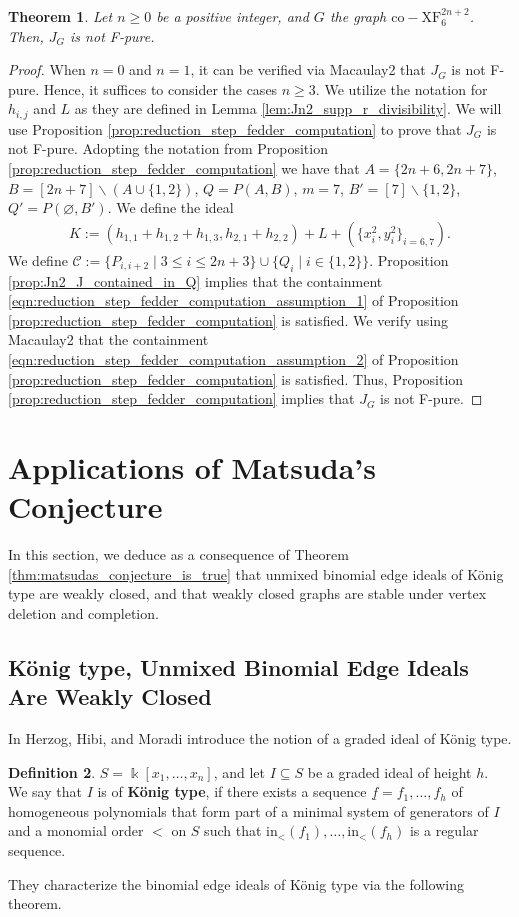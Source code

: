 \documentclass[12pt,a4paper]{amsart}
\theoremstyle{plain}
\newtheorem{thrm}{Theorem}[section]
\def\bthm{\begin{thrm}}
\def\ethm{\end{thrm}}
\theoremstyle{definition}
\newtheorem{defn}[thrm]{Definition}
\def\bdefn{\begin{defn}}
\def\edefn{\end{defn}}
\def\bproof{\begin{proof}}
\def\eproof{\end{proof}}
\theoremstyle{remark}
\let\setminus=\smallsetminus
\def\kk{\Bbbk}
\newcommand{\mc}[1]{\mathcal{ #1 }}
\newcommand{\ul}[1]{\underline{#1}}
\begin{document}
\bthm
\label{thm:Jn2_not_F_pure}
Let $n\geq 0$ be a positive integer, and $G$ the graph $\mathrm{co\!-\!XF}_6^{2n+2}$. Then, $J_{G}$ is not F-pure.
\ethm

\bproof
When $n = 0$ and $n = 1$, it can be verified via Macaulay2 that $J_{G}$ is not F-pure. Hence, it suffices to consider the cases $n \geq 3$. We utilize the notation for $h_{i,j}$ and $L$ as they are defined in Lemma \ref{lem:Jn2_supp_r_divisibility}. We will use Proposition \ref{prop:reduction_step_fedder_computation} to prove that $J_{G}$ is not F-pure. Adopting the notation from Proposition \ref{prop:reduction_step_fedder_computation} we have that $A = \{2n+6,2n+7\}$, $B = [2n+7] \setminus (A\cup \{1,2\})$, $Q = P(A,B)$, $m = 7$, $B' = [7] \setminus \{1,2\}$, $Q' = P(\varnothing,B')$. We define the ideal
\begin{align*}
    K := ( h_{1,1} + h_{1,2} + h_{1,3}, h_{2,1} + h_{2,2} ) + L + (\{ x_{i}^{2},y_{i}^{2} \}_{i=6,7} ).
\end{align*}
We define $\mc{C} := \{P_{i,i+2} \mid 3 \leq i \leq 2n+3\}\cup \{Q_{i} \mid i \in \{1,2\}\}$. Proposition \ref{prop:Jn2_J_contained_in_Q} implies that the containment  \eqref{eqn:reduction_step_fedder_computation_assumption_1} of Proposition \ref{prop:reduction_step_fedder_computation} is satisfied. We verify using Macaulay2 that the containment \eqref{eqn:reduction_step_fedder_computation_assumption_2} of Proposition \ref{prop:reduction_step_fedder_computation} is satisfied. Thus, Proposition \ref{prop:reduction_step_fedder_computation} implies that $J_{G}$ is not F-pure.
\eproof

\section{Applications of Matsuda's Conjecture}
\label{sec:application_matsuda_theorem}

In this section, we deduce as a consequence of Theorem \ref{thm:matsudas_conjecture_is_true} that unmixed binomial edge ideals of K\"onig type are weakly closed, and that weakly closed graphs are stable under vertex deletion and completion.

\subsection{K\"onig type, Unmixed Binomial Edge Ideals Are Weakly Closed}

In \cite{herzog2022graded} Herzog, Hibi, and Moradi introduce the notion of a graded ideal of K\"onig type. 
\bdefn
$S = \kk[x_1,\ldots,x_n]$, and let $I \subseteq S$ be a graded ideal of height $h$. We say that $I$ is of \textbf{K\"onig type}, if there exists a sequence $\ul{f} = f_1,\ldots,f_h$ of homogeneous polynomials
that form part of a minimal system of generators of $I$ and a monomial order $<$
on $S$ such that $\mathrm{in}_<(f_1),\ldots,\mathrm{in}_<(f_h)$ is a regular sequence.
\edefn
They characterize the binomial edge ideals of K\"onig type via the following theorem.
\end{document}
